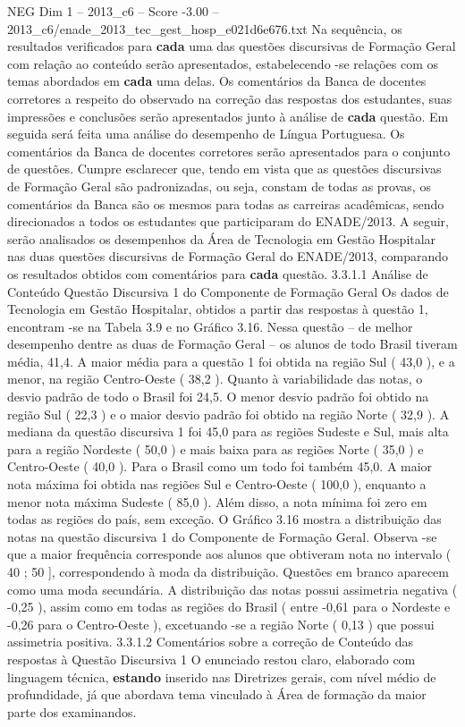 \begin{textsample}{NEG Dim 1 – 2013\_c6 – Score -3.00 – 2013\_c6/enade\_2013\_tec\_gest\_hosp\_e021d6e676.txt}
Na sequência, os resultados verificados para \textbf{cada} uma das questões discursivas de Formação Geral com relação ao conteúdo serão apresentados, estabelecendo -se relações com os temas abordados em \textbf{cada} uma delas.
Os comentários da Banca de docentes corretores a respeito do observado na correção das respostas dos estudantes, suas impressões e conclusões serão apresentados junto à análise de \textbf{cada} questão.
Em seguida será feita uma análise do desempenho de Língua Portuguesa.
Os comentários da Banca de docentes corretores serão apresentados para o conjunto de questões.
Cumpre esclarecer que, tendo em vista que as questões discursivas de Formação Geral são padronizadas, ou seja, constam de todas as provas, os comentários da Banca são os mesmos para todas as carreiras acadêmicas, sendo direcionados a todos os estudantes que participaram do ENADE/2013.
A seguir, serão analisados os desempenhos da Área de Tecnologia em Gestão Hospitalar nas duas questões discursivas de Formação Geral do ENADE/2013, comparando os resultados obtidos com comentários para \textbf{cada} questão. 3.3.1.1 Análise de Conteúdo Questão Discursiva 1 do Componente de Formação Geral Os dados de Tecnologia em Gestão Hospitalar, obtidos a partir das respostas à questão 1, encontram -se na Tabela 3.9 e no Gráfico 3.16.
Nessa questão – de melhor desempenho dentre as duas de Formação Geral – os alunos de todo Brasil tiveram média, 41,4.
A maior média para a questão 1 foi obtida na região Sul ( 43,0 ), e a menor, na região Centro-Oeste ( 38,2 ).
Quanto à variabilidade das notas, o desvio padrão de todo o Brasil foi 24,5.
O menor desvio padrão foi obtido na região Sul ( 22,3 ) e o maior desvio padrão foi obtido na região Norte ( 32,9 ).
A mediana da questão discursiva 1 foi 45,0 para as regiões Sudeste e Sul, mais alta para a região Nordeste ( 50,0 ) e mais baixa para as regiões Norte ( 35,0 ) e Centro-Oeste ( 40,0 ).
Para o Brasil como um todo foi também 45,0.
A maior nota máxima foi obtida nas regiões Sul e Centro-Oeste ( 100,0 ), enquanto a menor nota máxima Sudeste ( 85,0 ).
Além disso, a nota mínima foi zero em todas as regiões do país, sem exceção.
O Gráfico 3.16 mostra a distribuição das notas na questão discursiva 1 do Componente de Formação Geral.
Observa -se que a maior frequência corresponde aos alunos que obtiveram nota no intervalo ( 40 ; 50 ], correspondendo à moda da distribuição.
Questões em branco aparecem como uma moda secundária.
A distribuição das notas possui assimetria negativa ( -0,25 ), assim como em todas as regiões do Brasil ( entre -0,61 para o Nordeste e -0,26 para o Centro-Oeste ), excetuando -se a região Norte ( 0,13 ) que possui assimetria positiva. 3.3.1.2 Comentários sobre a correção de Conteúdo das respostas à Questão Discursiva 1 O enunciado restou claro, elaborado com linguagem técnica, \textbf{estando} inserido nas Diretrizes gerais, com nível médio de profundidade, já que abordava tema vinculado à Área de formação da maior parte dos examinandos.

\end{textsample}
